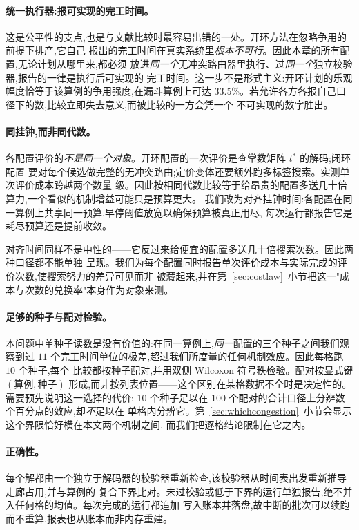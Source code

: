 \documentclass[manuscript,screen,review]{acmart}
\newcommand{\NSeeds}{10}
\newcommand{\NPairs}{100}
\newcommand{\ContentionHi}{33.5\%}
\begin{document}
\paragraph{统一执行器:报可实现的完工时间。}
这是公平性的支点,也是与文献比较时最容易出错的一处。开环方法在忽略争用的前提下排产,它自己
报出的完工时间在真实系统里\emph{根本不可行}。因此本章的所有配置,无论计划从哪里来,都必须
放进\emph{同一个}无冲突路由器里执行、过\emph{同一个}独立校验器,报告的一律是执行后可实现的
完工时间。这一步不是形式主义:开环计划的乐观幅度恰等于该算例的争用强度,在漏斗算例上可达
\ContentionHi{}。若允许各方各报自己口径下的数,比较立即失去意义,而被比较的一方会凭一个
不可实现的数字胜出。

\paragraph{同挂钟,而非同代数。}
各配置评价的\emph{不是同一个对象}。开环配置的一次评价是查常数矩阵 $t^{*}$ 的解码;闭环配置
要对每个候选做完整的无冲突路由;定价变体还要额外跑多标签搜索。实测单次评价成本跨越两个数量
级。因此按相同代数比较等于给昂贵的配置多送几十倍算力,一个看似的机制增益可能只是预算更大。
我们改为对齐挂钟时间:各配置在同一算例上共享同一预算,早停阈值放宽以确保预算被真正用尽,
每次运行都报告它是耗尽预算还是提前收敛。

对齐时间同样不是中性的——它反过来给便宜的配置多送几十倍搜索次数。因此两种口径都不能单独
呈现。我们为每个配置同时报告单次评价成本与实际完成的评价次数,使搜索努力的差异可见而非
被藏起来,并在第~\ref{sec:costlaw}~小节把这一"成本与次数的兑换率"本身作为对象来测。

\paragraph{足够的种子与配对检验。}
本问题中单种子读数是没有价值的:在同一算例上,\emph{同一}配置的三个种子之间我们观察到过
$11$ 个完工时间单位的极差,超过我们所度量的任何机制效应。因此每格跑 $\NSeeds$ 个种子,每个
比较都按种子配对,并用双侧 Wilcoxon 符号秩检验。配对按显式键 $(\text{算例},\text{种子})$
形成,而非按列表位置——这个区别在某格数据不全时是决定性的。需要预先说明这一选择的代价:
$\NSeeds$ 个种子足以在 $\NPairs$ 个配对的合计口径上分辨数个百分点的效应,却\emph{不}足以在
单格内分辨它。第~\ref{sec:whichcongestion}~小节会显示这个界限恰好横在本文两个机制之间,
而我们把逐格结论限制在它之内。

\paragraph{正确性。}
每个解都由一个独立于解码器的校验器重新检查,该校验器从时间表出发重新推导走廊占用,并与算例的
复合下界比对。未过校验或低于下界的运行单独报告,绝不并入任何格的均值。每次完成的运行都追加
写入账本并落盘,故中断的批次可以续跑而不重算,报表也从账本而非内存重建。
\end{document}
